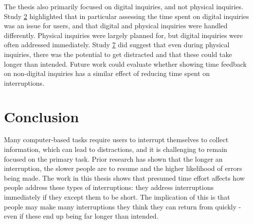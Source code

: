 The thesis also primarily focused on digital inquiries, and not physical inquiries. Study \hyperref[st:Study2]{2} highlighted that in particular assessing the time spent on digital inquiries was an issue for users, and that digital and physical inquiries were handled differently. Physical inquiries were largely planned for, but digital inquiries were often addressed immediately. Study \hyperref[st:Study7]{7} did suggest that even during physical inquiries, there was the potential to get distracted and that these could take longer than intended. Future work could evaluate whether showing time feedback on non-digital inquiries has a similar effect of reducing time spent on interruptions.





\section{Conclusion}
Many computer-based tasks require users to interrupt themselves to collect information, which can lead to distractions, and it is challenging to remain focused on the primary task. Prior research has shown that the longer an interruption, the slower people are to resume and the higher likelihood of errors being made. The work in this thesis shows that presumed time effort affects how people address these types of interruptions: they address interruptions immediately if they except them to be short. The implication of this is that people may make many interruptions they think they can return from quickly - even if these end up being far longer than intended.

